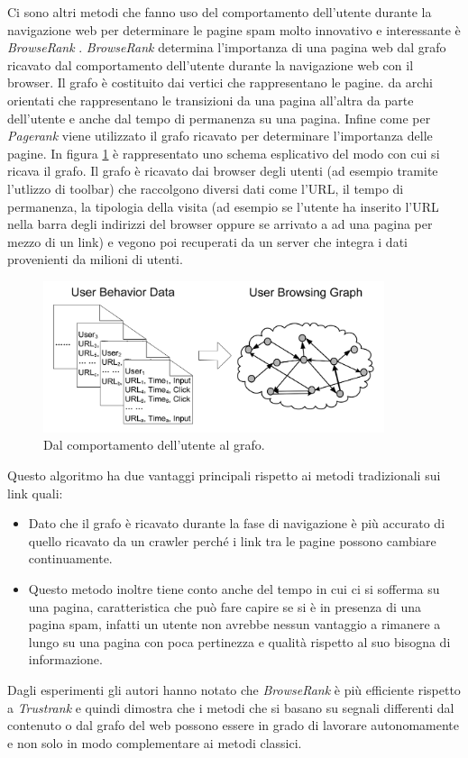 Ci sono altri metodi che fanno uso del comportamento dell'utente durante la navigazione web per determinare le pagine spam molto innovativo e interessante è \textit{BrowseRank} \cite{Liu:2008:BLW:1390334.1390412}. \textit{BrowseRank} determina l'importanza di una pagina web dal grafo ricavato dal comportamento dell'utente durante la navigazione web con il browser. Il grafo è costituito dai vertici che rappresentano le pagine. da archi orientati che rappresentano le transizioni da una pagina all'altra da parte dell'utente e anche dal tempo di permanenza su una pagina. Infine come per \textit{Pagerank} viene utilizzato il grafo ricavato per determinare l'importanza delle pagine. In figura \ref{img:browser} è rappresentato uno schema esplicativo del modo con cui si ricava il grafo. Il grafo è ricavato dai browser degli utenti (ad esempio tramite l'utlizzo di toolbar) che raccolgono diversi dati come l'URL, il tempo di permanenza, la tipologia della visita (ad esempio se l'utente ha inserito l'URL nella barra 
degli indirizzi del browser oppure se arrivato a ad una pagina per mezzo di un link) e vegono poi recuperati da un server che integra i dati provenienti da milioni di utenti.
\begin{figure}
\centering
\includegraphics[width=10cm]{immagini/altre/browser.png}
\caption{Dal comportamento dell'utente al grafo.}
\label{img:browser}
\end{figure}
Questo algoritmo ha due vantaggi principali rispetto ai metodi tradizionali sui link quali:
\begin{itemize}
 \item Dato che il grafo è ricavato durante la fase di navigazione è più accurato di quello ricavato da un crawler perché i link tra le pagine possono cambiare continuamente.
 \item Questo metodo inoltre tiene conto anche del tempo in cui ci si sofferma su una pagina, caratteristica che può fare capire se si è in presenza di una pagina spam, infatti un utente non avrebbe nessun vantaggio a rimanere a lungo su una pagina con poca pertinezza e qualità rispetto al suo bisogna di informazione.
\end{itemize}
Dagli esperimenti gli autori hanno notato che \textit{BrowseRank} è più efficiente rispetto a \textit{Trustrank} e quindi dimostra che i metodi che si basano su segnali differenti dal contenuto o dal grafo del web possono essere in grado di lavorare autonomamente e non solo in modo  complementare ai metodi classici.

